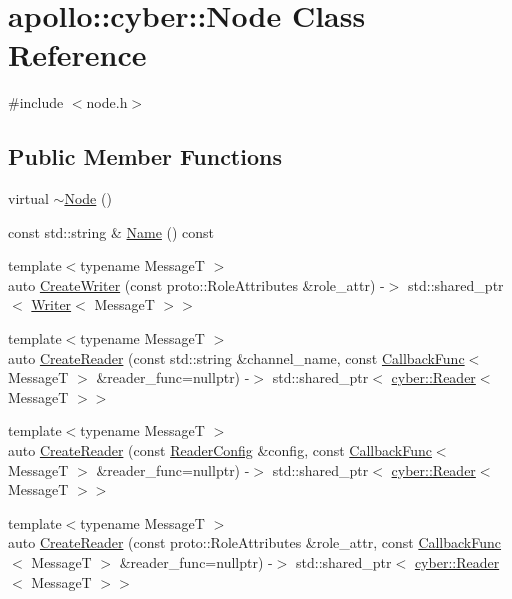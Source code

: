 \hypertarget{classapollo_1_1cyber_1_1Node}{\section{apollo\-:\-:cyber\-:\-:Node Class Reference}
\label{classapollo_1_1cyber_1_1Node}
}


{\ttfamily \#include $<$node.\-h$>$}

\subsection*{Public Member Functions}
\begin{DoxyCompactItemize}
\item 
virtual \hyperlink{classapollo_1_1cyber_1_1Node_a5dda5dd93c37631a8d4601398d0abf52}{$\sim$\-Node} ()
\item 
const std\-::string \& \hyperlink{classapollo_1_1cyber_1_1Node_a0fd0e39463d3407904f726217c0b9dbb}{Name} () const 
\item 
{\footnotesize template$<$typename Message\-T $>$ }\\auto \hyperlink{classapollo_1_1cyber_1_1Node_a6ba09b337623830c2a3c53e3f70de285}{Create\-Writer} (const proto\-::\-Role\-Attributes \&role\-\_\-attr) -\/$>$ std\-::shared\-\_\-ptr$<$ \hyperlink{classapollo_1_1cyber_1_1Writer}{Writer}$<$ Message\-T $>$$>$
\item 
{\footnotesize template$<$typename Message\-T $>$ }\\auto \hyperlink{classapollo_1_1cyber_1_1Node_acf60041ea3a94a5d002acaf1c8c74aee}{Create\-Reader} (const std\-::string \&channel\-\_\-name, const \hyperlink{namespaceapollo_1_1cyber_ac2b119de9ef52dbfcee3b6e8d497adc4}{Callback\-Func}$<$ Message\-T $>$ \&reader\-\_\-func=nullptr) -\/$>$ std\-::shared\-\_\-ptr$<$ \hyperlink{classapollo_1_1cyber_1_1Reader}{cyber\-::\-Reader}$<$ Message\-T $>$$>$
\item 
{\footnotesize template$<$typename Message\-T $>$ }\\auto \hyperlink{classapollo_1_1cyber_1_1Node_a2e17c58e7b3cd8867991cab633d90b8f}{Create\-Reader} (const \hyperlink{structapollo_1_1cyber_1_1ReaderConfig}{Reader\-Config} \&config, const \hyperlink{namespaceapollo_1_1cyber_ac2b119de9ef52dbfcee3b6e8d497adc4}{Callback\-Func}$<$ Message\-T $>$ \&reader\-\_\-func=nullptr) -\/$>$ std\-::shared\-\_\-ptr$<$ \hyperlink{classapollo_1_1cyber_1_1Reader}{cyber\-::\-Reader}$<$ Message\-T $>$$>$
\item 
{\footnotesize template$<$typename Message\-T $>$ }\\auto \hyperlink{classapollo_1_1cyber_1_1Node_a1d2ff5d6345df80ab6f519539ef62f9f}{Create\-Reader} (const proto\-::\-Role\-Attributes \&role\-\_\-attr, const \hyperlink{namespaceapollo_1_1cyber_ac2b119de9ef52dbfcee3b6e8d497adc4}{Callback\-Func}$<$ Message\-T $>$ \&reader\-\_\-func=nullptr) -\/$>$ std\-::shared\-\_\-ptr$<$ \hyperlink{classapollo_1_1cyber_1_1Reader}{cyber\-::\-Reader}$<$ Message\-T $>$$>$

\end{DoxyCompactItemize}

